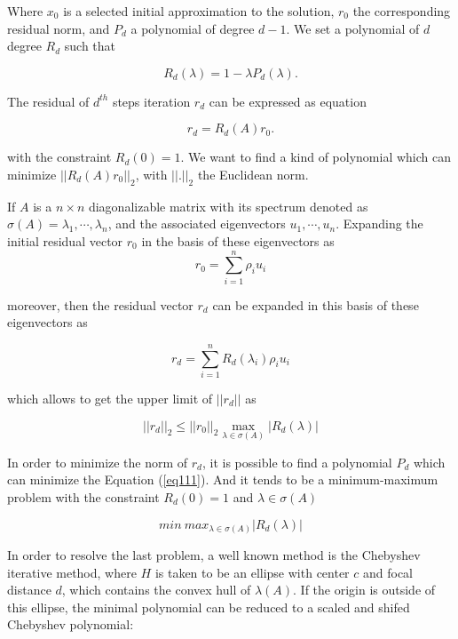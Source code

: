 Where \(x_0\) is a selected initial approximation to the solution, \(r_0\) the corresponding residual norm, and \(P_d\) a polynomial of degree \(d-1\). We set a polynomial of $d$ degree \(R_d\) such that

\begin{equation}
R_d(\lambda)=1-\lambda P_d(\lambda).
\end{equation}

The residual of \(d^{th}\) steps iteration \(r_d\) can be expressed as equation 

\begin{equation}
r_d=R_d(A)r_0.
\end{equation}

with the constraint \(R_d(0)=1\). We want to find a kind of polynomial which can minimize \(||R_d(A)r_0||_2\), with \(||.||_2\) the Euclidean norm.

If $A$ is a $n \times n$ diagonalizable matrix with its spectrum denoted as \(\sigma(A)=\lambda_1, \cdots, \lambda_n\), and the associated eigenvectors \(u_1, \cdots, u_n\). Expanding the initial residual vector $r_0$ in the basis of these eigenvectors as
\begin{equation}
\label{r0}
r_0=\sum_{i=1}^{n}\rho_i u_i
\end{equation}

moreover, then the residual vector \(r_d\) can be expanded in this basis of these eigenvectors as

\begin{equation}
\label{rn}
r_d=\sum_{i=1}^{n}R_d(\lambda_i)\rho_i u_i
\end{equation}

which allows to get the upper limit of $||r_d||$ as 

\begin{equation}
\label{eq111}
||r_d||_2 \leq ||r_0||_2 \max_{\lambda \in \sigma(A)}|R_d(\lambda)|
\end{equation}

In order to minimize the norm of \(r_d\), it is possible to find a polynomial $P_d$ which can minimize the Equation (\ref{eq111}). And it tends to be a minimum-maximum problem with the constraint \(R_d(0)=1\) and \(\lambda \in  \sigma(A)\)

\begin{equation}
min\ max_{\lambda \in \sigma (A)}|R_d(\lambda)|
\end{equation}

In order to resolve the last problem, a well known method is the Chebyshev iterative method, where \(H\) is taken to be an ellipse with center \(c\) and focal distance \(d\), which contains the convex hull of \(\lambda(A)\). If the origin is outside of this ellipse, the minimal polynomial can be reduced to a scaled and shifed Chebyshev polynomial:


